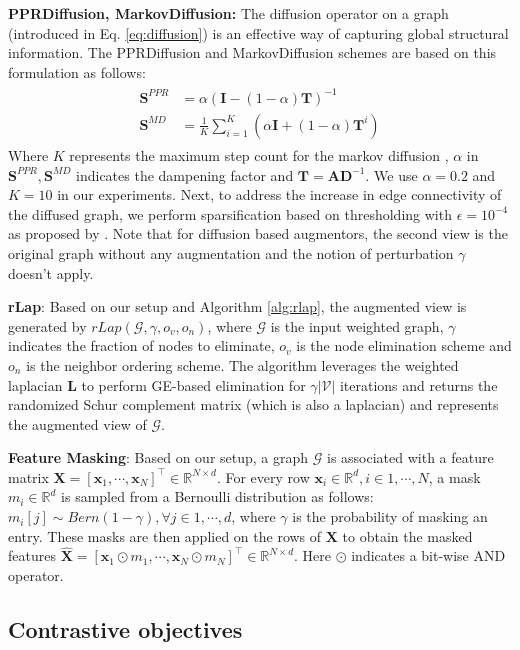 \documentclass{article}
\def\mA{{\mathbf{A}}}
\def\mD{{\mathbf{D}}}
\def\mI{{\mathbf{I}}}
\def\mL{{\mathbf{L}}}
\def\mS{{\mathbf{S}}}
\def\mT{{\mathbf{T}}}
\def\mX{{\mathbf{X}}}
\def\vx{{\mathbf{x}}}
\def\gG{{\mathcal{G}}}
\def\gV{{\mathcal{V}}}
\def\sR{{\mathbb{R}}}
\theoremstyle{plain}
\theoremstyle{definition}
\theoremstyle{remark}
\begin{document}
\textbf{PPRDiffusion, MarkovDiffusion:} The diffusion operator on a graph (introduced in Eq. \ref{eq:diffusion}) is an effective way of capturing global structural information. The PPRDiffusion and MarkovDiffusion schemes are based on this formulation as follows:
\begin{align}
\label{eq:aug_ppr_mdk}
\begin{split}
\mS^{PPR} &= \alpha(\mI - (1-\alpha)\mT)^{-1} \\
\mS^{MD} &= \frac{1}{K}\sum_{i=1}^K (\alpha \mI + (1-\alpha) \mT^i)
\end{split}
\end{align}
Where $K$ represents the maximum step count for the markov diffusion \citep{zhu2020simple}, $\alpha$ in $\mS^{PPR}, \mS^{MD}$ indicates the dampening factor and $\mT = \mA\mD^{-1}$. We use $\alpha = 0.2$ and $K = 10$ in our experiments. Next, to address the increase in edge connectivity of the diffused graph, we perform sparsification based on thresholding with $\epsilon=10^{-4}$ as proposed by \citet{klicpera2019diffusion}. Note that for diffusion based augmentors, the second view is the original graph without any augmentation and the notion of perturbation $\gamma$ doesn't apply.

\textbf{rLap}: Based on our setup and Algorithm \ref{alg:rlap}, the augmented view is generated by $rLap(\gG, \gamma, o_v, o_n)$, where $\gG$ is the input weighted graph, $\gamma$ indicates the fraction of nodes to eliminate, $o_v$ is the node elimination scheme and $o_n$ is the neighbor ordering scheme. The algorithm leverages the weighted laplacian $\mL$ to perform GE-based elimination for $\gamma|\gV|$ iterations and returns the randomized Schur complement matrix (which is also a laplacian) and represents the augmented view of $\gG$.

\textbf{Feature Masking}: Based on our setup, a graph $\gG$ is associated with a feature matrix $\mX = [\vx_1, \cdots, \vx_N]^{\top} \in \sR^{N \times d}$. For every row $\vx_i \in \sR^d, i \in {1, \cdots, N}$, a mask $m_i \in \sR^d$ is sampled from a Bernoulli distribution as follows: $m_i[j] \sim Bern(1-\gamma), \forall j \in {1, \cdots, d}$, where $\gamma$ is the probability of masking an entry. These masks are then applied on the rows of $\mX$ to obtain the masked features $\widehat{\mX} = [\vx_1 \odot m_1 , \cdots, \vx_N \odot m_N]^{\top} \in \sR^{N \times d}$. Here $\odot$ indicates a bit-wise AND operator.

\subsection{Contrastive objectives}
\end{document}
